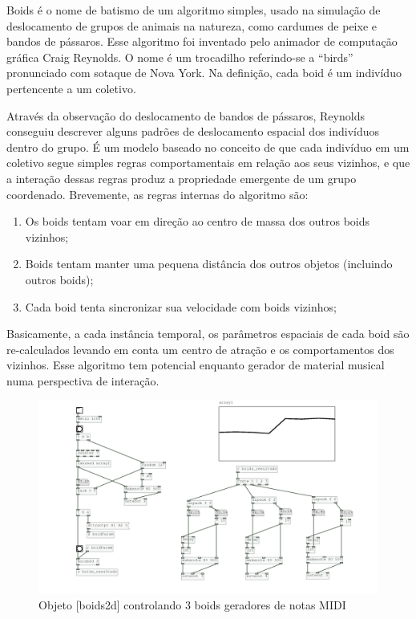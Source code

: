 \documentclass[draft]{ppgmus}
\begin{document}
Boids é o nome de batismo de um algoritmo simples, usado na simulação de deslocamento
de grupos de animais na natureza, como cardumes de peixe e bandos de pássaros.
Esse algoritmo foi inventado pelo animador de computação gráfica Craig Reynolds.
O nome é um trocadilho referindo-se a ``birds'' pronunciado com sotaque de Nova York.
Na definição, cada boid é um indivíduo pertencente a um coletivo.

Através da observação do deslocamento de bandos de pássaros, Reynolds conseguiu
descrever alguns padrões de deslocamento espacial dos indivíduos dentro do grupo.
É um modelo baseado no conceito de que cada indivíduo em um coletivo segue simples regras
comportamentais em relação aos seus vizinhos, e que a interação dessas regras
produz a propriedade emergente de um grupo coordenado.
Brevemente, as regras internas do algoritmo são:

\begin{enumerate}
 \item Os boids tentam voar em direção ao centro de massa dos outros boids vizinhos;
 \item Boids tentam manter uma pequena distância dos outros objetos (incluindo outros boids);
 \item Cada boid tenta sincronizar sua velocidade com boids vizinhos; 
\end{enumerate}

Basicamente, a cada instância temporal, os parâmetros espaciais de cada boid são re-calculados
levando em conta um centro de atração e os comportamentos dos vizinhos.
Esse algoritmo tem potencial enquanto gerador de material musical numa perspectiva de interação.

\begin{figure}
\includegraphics[scale=.6]{midi-boid}
\caption{Objeto [boids2d] controlando 3 boids geradores de notas MIDI}
\label{midi-boid}
\end{figure}  
\end{document}
